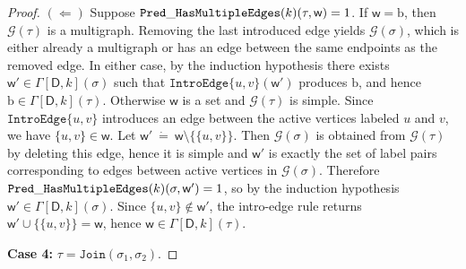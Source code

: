 \documentclass[11pt,a4paper]{article}
\newcommand{\truevalue}{1}
\newcommand{\treewidthvalue}{k}
\newcommand{\decompositiongraph}[1]{\mathcal{G}(#1)}
\newcommand{\introedgetype}[2]{\mathtt{IntroEdge}\{#1,#2\}}
\newcommand{\jointype}{\mathtt{Join}}
\newcommand{\introedgegeneric}[2]{\mathtt{IntroEdge}\{#1,#2\}}
\newcommand{\abstractdecomposition}{\tau}
\newcommand{\sigmaabstractdecomposition}{\sigma}
\newcommand{\defeq}{~\dot{=}~}
\newcommand{\vertexone}{u}
\newcommand{\vertextwo}{v}
\newcommand{\awitness}{\mathsf{w}}
\newcommand{\dpcore}{\mathsf{D}}
\newcommand{\dpNamePart}[1]{\mbox{\normalfont\ttfamily #1}}
\newcommand{\predicateHasMultiEdge}[1]{\dpNamePart{Pred}\_\allowbreak\dpNamePart{HasMultipleEdges}(#1)}
\newcommand{\dynamizationfunctionname}[1]{\Gamma[{#1}]}
\newcommand{\dynamizationfunction}[2]{\dynamizationfunctionname{#1,#2}}
\newcommand{\multiedgefound}{\mathrm{b}}
\begin{document}
{\begin{proof}
			$(\Leftarrow)$ Suppose \(\predicateHasMultiEdge{\treewidthvalue}(\abstractdecomposition,\awitness)=\truevalue\). If \(\awitness=\multiedgefound\), then \(\decompositiongraph{\abstractdecomposition}\) is a multigraph. Removing the last introduced edge yields \(\decompositiongraph{\sigmaabstractdecomposition}\), which is either already a multigraph or has an edge between the same endpoints as the removed edge. In either case, by the induction hypothesis there exists \(\awitness'\in \dynamizationfunction{\dpcore}{\treewidthvalue}(\sigmaabstractdecomposition)\) such that \(\introedgegeneric{\vertexone}{\vertextwo}(\awitness')\) produces \(\multiedgefound\), and hence \(\multiedgefound\in \dynamizationfunction{\dpcore}{\treewidthvalue}(\abstractdecomposition)\). Otherwise \(\awitness\) is a set and \(\decompositiongraph{\abstractdecomposition}\) is simple. Since \(\introedgetype{\vertexone}{\vertextwo}\) introduces an edge between the active vertices labeled \(\vertexone\) and \(\vertextwo\), we have \(\{\vertexone,\vertextwo\}\in \awitness\). Let \(\awitness'\defeq \awitness\setminus\{\{\vertexone,\vertextwo\}\}\). Then \(\decompositiongraph{\sigmaabstractdecomposition}\) is obtained from \(\decompositiongraph{\abstractdecomposition}\) by deleting this edge, hence it is simple and \(\awitness'\) is exactly the set of label pairs corresponding to edges between active vertices in \(\decompositiongraph{\sigmaabstractdecomposition}\). Therefore \(\predicateHasMultiEdge{\treewidthvalue}(\sigmaabstractdecomposition,\awitness')=\truevalue\), so by the induction hypothesis \(\awitness'\in \dynamizationfunction{\dpcore}{\treewidthvalue}(\sigmaabstractdecomposition)\). Since \(\{\vertexone,\vertextwo\}\notin \awitness'\), the intro-edge rule returns \(\awitness'\cup\{\{\vertexone,\vertextwo\}\}=\awitness\), hence \(\awitness\in \dynamizationfunction{\dpcore}{\treewidthvalue}(\abstractdecomposition)\).

		\medskip
		\noindent\textbf{Case 4:} \(\abstractdecomposition=\jointype(\sigmaabstractdecomposition_1,\sigmaabstractdecomposition_2)\).


\end{proof}}
\end{document}
